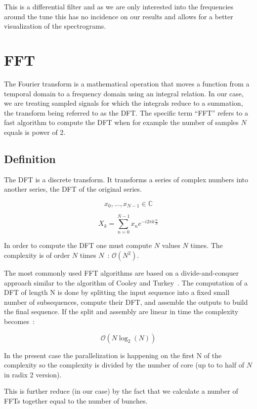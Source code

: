 This is a differential filter and as we are only interested into the frequencies around the tune this has no incidence on our results and allows for a better visualization of the spectrograms.

\section{FFT}
\label{sec:FFT}

The Fourier transform is a mathematical operation that moves a function from a temporal domain to a frequency domain using an integral relation. In our case, we are treating sampled signals for which the integrals reduce to a summation, the transform being referred to as the \gls{DFT}. The specific term ``\gls{FFT}'' refers to a fast algorithm to compute the \gls{DFT} when for example the number of samples $N$ equals is power of 2.

\subsection{Definition}

The \gls{DFT} is a discrete transform. It transforms a series of complex numbers into another series, the \gls{DFT} of the original series.

$$ x_0,...,x_{N -1} \in \mathbb{C} $$

$$ X_{k} = \displaystyle\sum\limits_{n = 0}^{N -1} x_{n}e^{-i 2 \pi k \frac{n}{N}} $$

In order to compute the \gls{DFT} one must compute $N$ values $N$ times. The complexity is of order $N$ times $N$~: $ \mathcal{O}(N^{2}) $.

The most commonly used \gls{FFT} algorithms are based on a divide-and-conquer approach similar to the algorithm of Cooley and Turkey~\cite{Cooley65}. The computation of a \gls{DFT} of length N is done by splitting the input sequence into a fixed small number of subsequences, compute their \gls{DFT}, and assemble the outputs to build the final sequence. If the split and assembly are linear in time the complexity becomes~:

$$ \mathcal{O}(N \log_{2}(N)) $$

In the present case the parallelization is happening on the first N of the complexity so the complexity is divided by the number of core (up to to half of $N$ in radix 2 version). 

This is further reduce (in our case) by the fact that we calculate a number of \glspl{FFT} together equal to the number of bunches.

